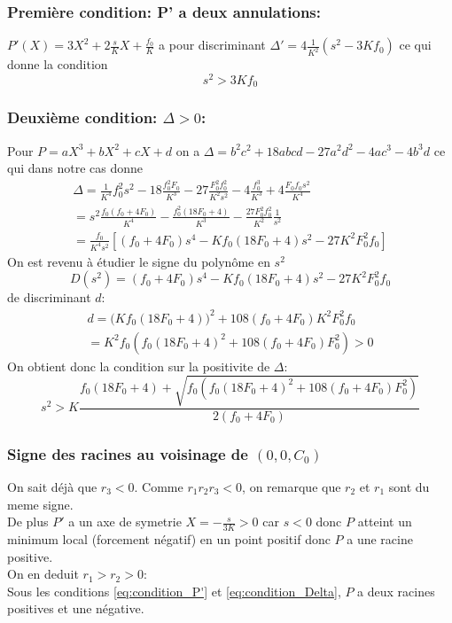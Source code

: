 \subsubsection{Première condition: P' a deux annulations:}
$P'(X)= 3X^2+ 2\frac{s}{K}X+ \frac{f_0}{K}$ a pour discriminant $\Delta'=4\frac{1}{K^2}(s^2-3Kf_0)$ ce qui donne la condition \begin{equation} \label{eq:condition_P'}
	\boxed{s^2 >3K f_0
	}
\end{equation}
\subsubsection{Deuxième condition: $\Delta>0$:}
Pour $P=aX^3 +bX^2 + cX + d$ on a $\Delta= b^2c^2 +18abcd-27a^2d^2 -4ac^3 -4b^3d$ ce qui dans notre cas donne
\begin{align*}
	\Delta=\frac{1}{K^4}f_0^2s^2 -18 \frac{f_0^2F_0}{K^3}-27 \frac{F_0^2 f_0^2}{K^2s^2} - 4 \frac{f_0^3}{K^3}+4 \frac{F_0f_0s^2}{K^4} \\ = s^2 \frac{f_0(f_0+4F_0)}{K^4}- \frac{f_0^2(18F_0+4)}{K^3} -\frac{27F_0^2f_0^2}{K^2} \frac{1}{s^2}\\ 
=	\frac{f_0}{K^4s^2}[(f_0+4F_0)s^4-Kf_0(18F_0+4) s^2 - 27 K^2F_0^2f_0] \end{align*}
On est revenu à étudier le signe du polynôme en $s^2$ \begin{equation}
	D(s^2)=(f_0+4F_0)s^4-Kf_0(18F_0+4)s^2 - 27 K^2F_0^2f_0
\end{equation} 
de discriminant $d$:
\begin{align*}
	d=\Big(Kf_0(18F_0+4) \Big)^2 +108(f_0+4F_0)K^2F_0^2f_0 \\ 
	= K^2f_0(f_0(18F_0+4)^2+108(f_0+4F_0)F_0^2) >0
\end{align*}
On obtient donc la condition sur la positivite de $\Delta$: 
\begin{equation}\boxed{
	s^2> K\frac{f_0(18F_0+4)+\sqrt{f_0(f_0(18F_0+4)^2+108(f_0+4F_0)F_0^2)}}{2(f_0+4F_0)}
	}\label{eq:condition_Delta}
\end{equation}
\subsubsection{Signe des racines au voisinage de $(0,0,C_0)$}
On sait déjà que $r_3<0$. Comme $r_1r_2r_3<0$, on remarque que $r_2$ et $r_1$ sont du meme signe.\\
De plus $P'$ a un axe de symetrie $X=-\frac{s}{3K}>0$ car $s<0$ donc $P$ atteint un minimum local (forcement négatif) en un point positif donc $P$ a une racine positive.\\
On en deduit $r_1>r_2>0$: \\ 
Sous les conditions \eqref{eq:condition_P'} et \eqref{eq:condition_Delta}, $P$ a deux racines positives et une négative.
